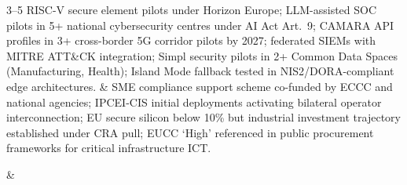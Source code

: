 \begin{landscape}
\begin{longtable}
3--5 RISC-V secure element pilots under Horizon Europe; LLM-assisted SOC
pilots in 5+ national cybersecurity centres under AI Act Art.~9; CAMARA API
profiles in 3+ cross-border 5G corridor pilots by 2027; federated SIEMs
with MITRE ATT\&CK integration; Simpl security pilots in 2+ Common Data
Spaces (Manufacturing, Health); Island Mode fallback tested in
NIS2/DORA-compliant edge architectures.
&
SME compliance support scheme co-funded by ECCC and national agencies;
IPCEI-CIS initial deployments activating bilateral operator interconnection;
EU secure silicon below 10\% but industrial investment trajectory established
under CRA pull; EUCC `High' referenced in public procurement frameworks for
critical infrastructure ICT.
\\
\hline

 &
\\
\hline


\end{longtable}
\end{landscape}
